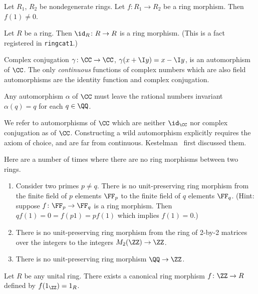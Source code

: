 \begin{theorem}
Let $R_{1}$, $R_{2}$ be nondegenerate rings.
Let $f\colon R_{1}\to R_{2}$ be a ring morphism.
Then $f(1)\neq0$.
\end{theorem}

\begin{example}%
Let $R$ be a ring. Then $\id_{R}\colon R\to R$ is a ring morphism.
(This is a fact registered in \texttt{ringcat1}.)
\end{example}

\begin{example}
Complex conjugation $\gamma\colon\CC\to\CC$, $\gamma(x+\I y)=x-\I y$,
is an automorphism of $\CC$. The only \emph{continuous} functions of
complex numbers which are also field automorphisms are the identity
function and complex conjugation.

Any automorphism $\alpha$ of $\CC$ must leave the rational numbers
invariant $\alpha(q)=q$ for each $q\in\QQ$.

We refer to automorphisms of $\CC$ which are neither $\id_{\CC}$ nor
complex conjugation as  of $\CC$.
Constructing a wild automorphism explicitly requires the axiom of choice,
and are far from continuous. Kestelman~\cite{kestelman1951automorphisms}
first discussed them.
\end{example}

\begin{example}
Here are a number of times where there are no ring morphisms between
two rings.
\begin{enumerate}
\item Consider two primes $p\neq q$. There is no unit-preserving ring
morphism from the finite field of $p$ elements $\FF_{p}$ to the finite
field of $q$ elements $\FF_{q}$. (Hint: suppose
$f\colon\FF_{p}\to\FF_{q}$ is a ring morphism. Then
$qf(1)=0=f(p1)=pf(1)$ which implies $f(1)=0$.)
\item  There is no unit-preserving ring morphism from the ring of 2-by-2
matrices over the integers to the integers $M_{2}(\ZZ)\to\ZZ$.
\item There is no unit-preserving ring morphism $\QQ\to\ZZ$.
\end{enumerate}
\end{example}

\begin{example}
Let $R$ be any unital ring. There exists a canonical ring morphism
$f\colon\ZZ\to R$ defined by $f(1_{\ZZ})=1_{R}$.
\end{example}

